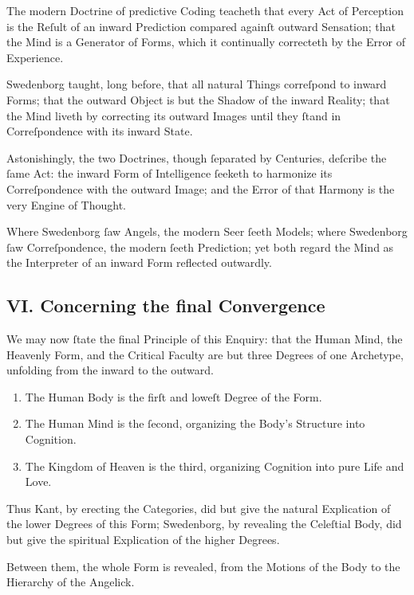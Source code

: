 \documentclass[12pt]{article}
\begin{document}
The modern Doctrine of predictive Coding teacheth that every Act of 
Perception is the Reſult of an inward Prediction compared againſt outward 
Sensation; that the Mind is a Generator of Forms, which it continually 
correcteth by the Error of Experience.

Swedenborg taught, long before, that all natural Things correſpond to inward 
Forms; that the outward Object is but the Shadow of the inward Reality; that 
the Mind liveth by correcting its outward Images until they ſtand in 
Correſpondence with its inward State.

Astonishingly, the two Doctrines, though ſeparated by Centuries, deſcribe the 
ſame Act: the inward Form of Intelligence ſeeketh to harmonize its 
Correſpondence with the outward Image; and the Error of that Harmony is the 
very Engine of Thought.

Where Swedenborg ſaw Angels, the modern Seer ſeeth Models; where Swedenborg 
ſaw Correſpondence, the modern ſeeth Prediction; yet both regard the Mind as 
the Interpreter of an inward Form reflected outwardly.

\subsection*{VI. Concerning the final Convergence}

We may now ſtate the final Principle of this Enquiry: that the Human Mind, the 
Heavenly Form, and the Critical Faculty are but three Degrees of one 
Archetype, unfolding from the inward to the outward.

\begin{enumerate}
\item The Human Body is the firſt and loweſt Degree of the Form.
\item The Human Mind is the ſecond, organizing the Body’s Structure into 
Cognition.
\item The Kingdom of Heaven is the third, organizing Cognition into pure 
Life and Love.
\end{enumerate}

Thus Kant, by erecting the Categories, did but give the natural Explication of 
the lower Degrees of this Form; Swedenborg, by revealing the Celeſtial Body, 
did but give the spiritual Explication of the higher Degrees.

Between them, the whole Form is revealed, from the Motions of the Body to the 
Hierarchy of the Angelick.
\end{document}
